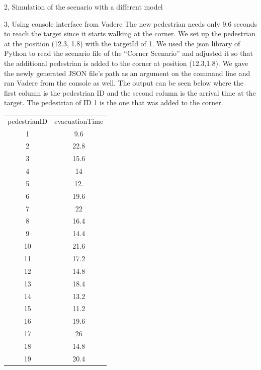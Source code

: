 \documentclass[10pt,a4paper]{article}
\begin{document}
\begin{task}{2, Simulation of the scenario with a different model}
\end{task}

\begin{task}{3, Using console interface from Vadere}
The new pedestrian needs only 9.6 seconds to reach the target since it starts walking at the corner. We set up the pedestrian at the position (12.3, 1.8) with the targetId of 1. We used the json library of Python to read the scenario file of the “Corner Scenario” and adjusted it so that the additional pedestrian is added to the corner at position (12.3,1.8). We gave the newly generated JSON file’s path as an argument on the command line and ran Vadere from the console as well. The output can be seen below where the first column is the pedestrian ID and the second column is the arrival time at the target. The pedestrian of ID 1 is the one that was added to the corner.\\
\bigbreak
    \begin{tabular}{c|c}
    pedestrianID&evacuationTime\\
        1&	9.6\\
        2&	22.8\\
        3&	15.6\\
        4&	14\\
        5&	12.\\
        6&	19.6\\
        7&	22\\
        8&	16.4\\
        9&	14.4\\
        10&	21.6\\
        11&	17.2\\
        12&	14.8\\
        13&	18.4\\
        14&	13.2\\
        15&	11.2\\
        16&	19.6\\
        17&	26\\
        18&	14.8\\
        19&	20.4\\
    \end{tabular}
    \bigbreak
\end{task}
\end{document}
